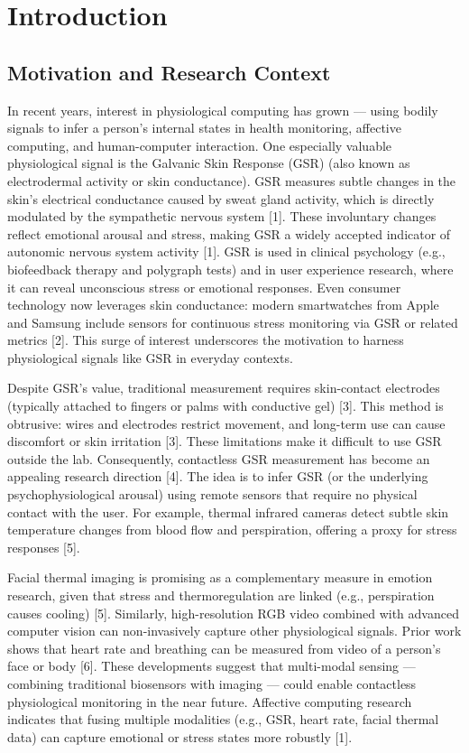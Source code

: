 \chapter{Introduction}

\section{Motivation and Research Context}
In recent years, interest in physiological computing has grown --- using bodily signals to infer a person's internal states in health monitoring, affective computing, and human-computer interaction. One especially valuable physiological signal is the Galvanic Skin Response (GSR) (also known as electrodermal activity or skin conductance). GSR measures subtle changes in the skin's electrical conductance caused by sweat gland activity, which is directly modulated by the sympathetic nervous system [1]. These involuntary changes reflect emotional arousal and stress, making GSR a widely accepted indicator of autonomic nervous system activity [1]. GSR is used in clinical psychology (e.g., biofeedback therapy and polygraph tests) and in user experience research, where it can reveal unconscious stress or emotional responses. Even consumer technology now leverages skin conductance: modern smartwatches from Apple and Samsung include sensors for continuous stress monitoring via GSR or related metrics [2]. This surge of interest underscores the motivation to harness physiological signals like GSR in everyday contexts.

Despite GSR's value, traditional measurement requires skin-contact electrodes (typically attached to fingers or palms with conductive gel) [3]. This method is obtrusive: wires and electrodes restrict movement, and long-term use can cause discomfort or skin irritation [3]. These limitations make it difficult to use GSR outside the lab. Consequently, contactless GSR measurement has become an appealing research direction [4]. The idea is to infer GSR (or the underlying psychophysiological arousal) using remote sensors that require no physical contact with the user. For example, thermal infrared cameras detect subtle skin temperature changes from blood flow and perspiration, offering a proxy for stress responses [5].

Facial thermal imaging is promising as a complementary measure in emotion research, given that stress and thermoregulation are linked (e.g., perspiration causes cooling) [5]. Similarly, high-resolution RGB video combined with advanced computer vision can non-invasively capture other physiological signals. Prior work shows that heart rate and breathing can be measured from video of a person's face or body [6]. These developments suggest that multi-modal sensing --- combining traditional biosensors with imaging --- could enable contactless physiological monitoring in the near future. Affective computing research indicates that fusing multiple modalities (e.g., GSR, heart rate, facial thermal data) can capture emotional or stress states more robustly [1].

